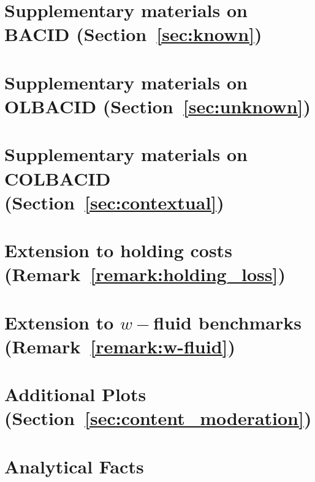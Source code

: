 \documentclass[11pt]{article}
\begin{document}
\section{Supplementary materials on \textsc{BACID} (Section~\ref{sec:known})}\label{app:known}

\section{Supplementary materials on \textsc{OLBACID} (Section~\ref{sec:unknown})}\label{app:unknown}

\section{Supplementary materials on \textsc{COLBACID} (Section~\ref{sec:contextual})}\label{app:contextual}

\section{Extension to holding costs (Remark~\ref{remark:holding_loss})}\label{app:holding-cost}

\section{Extension to $w-$fluid benchmarks (Remark~\ref{remark:w-fluid})}\label{app:w-fluid}

\section{Additional Plots (Section~\ref{sec:content_moderation})}\label{app:numerics}

\section{Analytical Facts}

\end{document}
